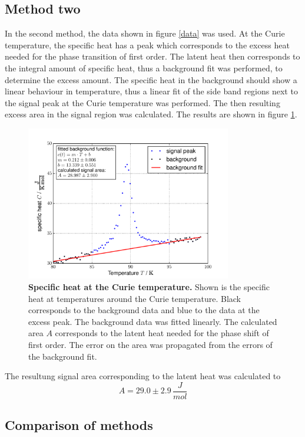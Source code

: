 \documentclass{include/thesisclass3}
\newcommand{\e}[1]{\,\si{#1}}
\begin{document}
\subsection{Method two}
In the second method, the data shown in figure \ref{data} was used. 
At the Curie temperature, the specific heat has a peak which corresponds to the excess heat needed for the phase transition of first order.
The latent heat then corresponds to the integral amount of specific heat, thus a background fit was performed, to determine the excess amount.
The specific heat in the background should show a linear behaviour in temperature, thus a linear fit of the side band regions next to the signal peak at the Curie temperature was performed.
The then resulting excess area in the signal region was calculated.
The results are shown in figure \ref{area}.
\begin{figure}[H]
\includegraphics[width = 0.8\textwidth]{fig/latentheat_area.pdf}
\caption{\label{area}\textbf{Specific heat at the Curie temperature.} Shown is the specific heat at temperatures around the Curie temperature. Black corresponds to the background data and blue to the data at the excess peak. The background data was fitted linearly. The calculated area $A$ corresponds to the latent heat needed for the phase shift of first order. The error on the area was propagated from the errors of the background fit.}

\end{figure}
The resultung signal area corresponding to the latent heat was calculated to
\[ A = 29.0 \pm 2.9 \e{\frac{J}{mol}}\]

\subsection{Comparison of methods}
\end{document}
